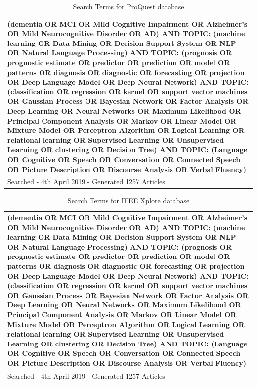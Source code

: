 \documentclass[12pt]{article}
\begin{document}
\begin{table}
	\begin{tabular}{ p{12cm} }
	\hline
	(dementia OR MCI OR Mild Cognitive Impairment OR Alzheimer's OR Mild Neurocognitive Disorder OR AD) AND TOPIC: (machine learning OR Data Mining OR Decision Support System OR NLP OR Natural 			Language Processing) AND TOPIC: (prognosis OR prognostic estimate OR predictor OR prediction OR model OR patterns OR diagnosis OR diagnostic OR forecasting OR projection OR Deep Language Model 		OR Deep Neural Network) AND TOPIC: (classification OR regression OR kernel OR support vector machines OR Gaussian Process OR Bayesian Network OR Factor Analysis OR Deep Learning OR Neural 			Networks OR Maximum Likelihood OR Principal Component Analysis OR Markov OR Linear Model OR Mixture Model OR Perceptron Algorithm OR Logical Learning OR relational learning OR Supervised 				Learning OR Unsupervised Learning OR clustering OR Decision Tree) AND TOPIC: (Language OR Cognitive OR Speech OR Conversation OR Connected Speech OR Picture Description OR Discourse Analysis OR 		Verbal Fluency)  \\ \hline
	Searched - 4th April 2019 - Generated 1257 Articles \\
	\hline
	\end{tabular}
	\caption[Table caption text]{Search Terms for ProQuest database}
	\label{table:name}
\end{table}

\begin{table}
	\begin{tabular}{ p{12cm} }
	\hline
	(dementia OR MCI OR Mild Cognitive Impairment OR Alzheimer's OR Mild Neurocognitive Disorder OR AD) AND TOPIC: (machine learning OR Data Mining OR Decision Support System OR NLP OR Natural 			Language Processing) AND TOPIC: (prognosis OR prognostic estimate OR predictor OR prediction OR model OR patterns OR diagnosis OR diagnostic OR forecasting OR projection OR Deep Language Model 		OR Deep Neural Network) AND TOPIC: (classification OR regression OR kernel OR support vector machines OR Gaussian Process OR Bayesian Network OR Factor Analysis OR Deep Learning OR Neural 			Networks OR Maximum Likelihood OR Principal Component Analysis OR Markov OR Linear Model OR Mixture Model OR Perceptron Algorithm OR Logical Learning OR relational learning OR Supervised 				Learning OR Unsupervised Learning OR clustering OR Decision Tree) AND TOPIC: (Language OR Cognitive OR Speech OR Conversation OR Connected Speech OR Picture Description OR Discourse Analysis OR 		Verbal Fluency)  \\ \hline
	Searched - 4th April 2019 - Generated 1257 Articles \\
	\hline
	\end{tabular}
	\caption[Table caption text]{Search Terms for IEEE Xplore database}
	\label{table:name}
\end{table}
\end{document}
